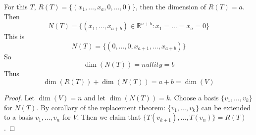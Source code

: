 \documentclass{article}
\newtheorem{one minute paper}[theorem]{One Minute Paper}
\begin{document}
For this $T$, $R(T) = \{(x_1, \dots, x_a, 0, \dots, 0)\}$, then the dimension of $R(T) = a$. Then 
\begin{equation}
    N(T) = \{(x_1, \dots, x_{a+b}) \in \mathbb{R}^{a+b} : x_1 = \dots = x_a = 0\}
\end{equation} 
This is 
\begin{equation}
    N(T) = \{(0, \dots, 0, x_{a+1}, \dots, x_{a+b})\}
\end{equation}
So 
\begin{equation}
    \dim(N(T)) = nullity = b
\end{equation}
Thus 
\begin{equation}
    \dim(R(T)) + \dim(N(T)) = a + b = \dim(V)
\end{equation}

\begin{proof}
    Let $\dim(V) = n$ and let $\dim(N(T)) = k$. Choose a basis $\{v_1, \dots, v_k\}$ for $N(T)$. By corallary of the replacement theorem:
    $\{v_1, \dots, v_k\}$ can be extended to a basis $v_1, \dots, v_n$ for $V$. Then we claim that $\{T(v_{k+1}), \dots, T(v_n)\} = R(T)$.

\end{proof}
\end{document}
